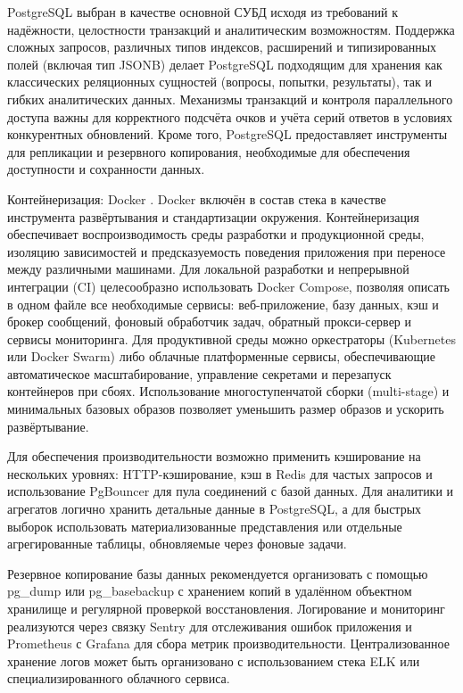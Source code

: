 \documentclass[14pt,a4paper]{extreport}
\begin{document}
PostgreSQL \cite{postgresql} выбран в качестве основной СУБД исходя из требований к надёжности, целостности транзакций и аналитическим возможностям. Поддержка сложных запросов, различных типов индексов, расширений и типизированных полей (включая тип JSONB) делает PostgreSQL подходящим для хранения как классических реляционных сущностей (вопросы, попытки, результаты), так и гибких аналитических данных. Механизмы транзакций и контроля параллельного доступа важны для корректного подсчёта очков и учёта серий ответов в условиях конкурентных обновлений. Кроме того, PostgreSQL предоставляет инструменты для репликации и резервного копирования, необходимые для обеспечения доступности и сохранности данных.

Контейнеризация: Docker \cite{docker}. Docker включён в состав стека в качестве инструмента развёртывания и стандартизации окружения. Контейнеризация обеспечивает воспроизводимость среды разработки и продукционной среды, изоляцию зависимостей и предсказуемость поведения приложения при переносе между различными машинами. Для локальной разработки и непрерывной интеграции (CI) целесообразно использовать Docker Compose, позволяя описать в одном файле все необходимые сервисы: веб-приложение, базу данных, кэш и брокер сообщений, фоновый обработчик задач, обратный прокси-сервер и сервисы мониторинга. Для продуктивной среды можно оркестраторы (Kubernetes или Docker Swarm) либо облачные платформенные сервисы, обеспечивающие автоматическое масштабирование, управление секретами и перезапуск контейнеров при сбоях. Использование многоступенчатой сборки (multi-stage) и минимальных базовых образов позволяет уменьшить размер образов и ускорить развёртывание.

Для обеспечения производительности возможно применить кэширование на нескольких уровнях: HTTP-кэширование, кэш в Redis для частых запросов и использование PgBouncer для пула соединений с базой данных. Для аналитики и агрегатов логично хранить детальные данные в PostgreSQL, а для быстрых выборок использовать материализованные представления или отдельные агрегированные таблицы, обновляемые через фоновые задачи.

Резервное копирование базы данных рекомендуется организовать с помощью pg\_dump или pg\_basebackup с хранением копий в удалённом объектном хранилище и регулярной проверкой восстановления. Логирование и мониторинг реализуются через связку Sentry для отслеживания ошибок приложения и Prometheus с Grafana для сбора метрик производительности. Централизованное хранение логов может быть организовано с использованием стека ELK или специализированного облачного сервиса.
\end{document}
